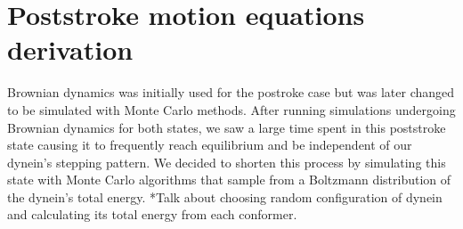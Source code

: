 \documentclass[9pt,twocolumn,twoside]{article}
\begin{document}
\section*{Poststroke motion equations derivation}
Brownian dynamics was initially used for the postroke case but was later changed to be simulated with Monte Carlo methods. After running simulations undergoing Brownian dynamics for both states, we saw a large time spent in this poststroke state causing it to frequently reach equilibrium and be independent of our dynein's stepping pattern. We decided to shorten this process by simulating this state with Monte Carlo algorithms that sample from a Boltzmann distribution of the dynein's total energy. 
*Talk about choosing random configuration of dynein and calculating its total energy from each conformer. 



\end{document}
